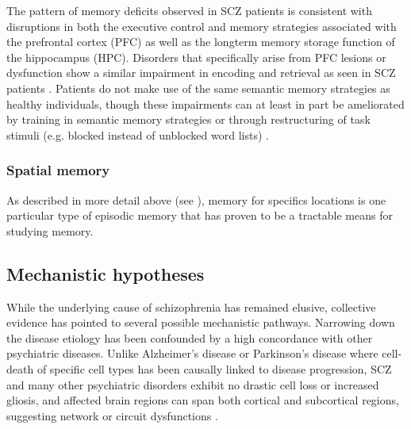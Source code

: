 The pattern of memory deficits observed in SCZ patients is consistent with disruptions in both the executive control and memory strategies associated with the prefrontal cortex (PFC) as well as the longterm memory storage function of the hippocampus (HPC).
Disorders that specifically arise from PFC lesions or dysfunction show a similar impairment in encoding and retrieval as seen in SCZ patients \citep{Ranganath2008}.
Patients do not make use of the same semantic memory strategies as healthy individuals, though these impairments can at least in part be ameliorated by training in semantic memory strategies or through restructuring of task stimuli (e.g. blocked instead of unblocked word lists) \citep{2 entries from tonight}.

\subsubsection{Spatial memory}
As described in more detail above (see ), memory for specifics locations is one particular type of episodic memory that has proven to be a tractable means for studying memory.


\subsection{Mechanistic hypotheses}
While the underlying cause of schizophrenia has remained elusive, collective evidence has pointed to several possible mechanistic pathways.
Narrowing down the disease etiology has been confounded by a high concordance with other psychiatric diseases.
Unlike Alzheimer’s disease or Parkinson’s disease where cell-death of specific cell types has been causally linked to disease progression, SCZ and many other psychiatric disorders exhibit no drastic cell loss or increased gliosis, and affected brain regions can span both cortical and subcortical regions, suggesting network or circuit dysfunctions \citep{Uhlhaas2012}\citep{Lewis2002}.
